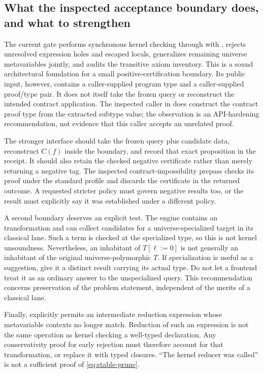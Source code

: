\subsection{What the inspected acceptance boundary does, and what to strengthen}

The current gate performs synchronous kernel checking through  with , rejects unresolved expression holes and escaped locals, generalizes remaining universe metavariables jointly, and audits the transitive axiom inventory. This is a sound architectural foundation for a small positive-certification boundary. Its public input, however, contains a caller-supplied program type and a caller-supplied proof/type pair. It does not itself take the frozen query or reconstruct the intended contract application. The inspected caller in  does construct the contract proof type from the extracted subtype value; the observation is an API-hardening recommendation, not evidence that this caller accepts an unrelated proof.\cite{implementation}

The stronger interface should take the frozen query plus candidate data, reconstruct $C(f)$ inside the boundary, and record that exact proposition in the receipt. It should also retain the checked negative certificate rather than merely returning a negative tag. The inspected contract-impossibility prepass checks its proof under the standard profile and discards the certificate in the returned outcome. A requested stricter policy must govern negative results too, or the result must explicitly say it was established under a different policy.\cite{implementation}

A second boundary deserves an explicit test. The engine contains an  transformation and can collect candidates for a universe-specialized target in its classical lane. Such a term is checked at the specialized type, so this is not kernel unsoundness. Nevertheless, an inhabitant of $T[\ell:=0]$ is not generally an inhabitant of the original universe-polymorphic $T$. If specialization is useful as a suggestion, give it a distinct result carrying its actual type. Do not let a frontend treat it as an ordinary answer to the unspecialized query. This recommendation concerns preservation of the problem statement, independent of the merits of a classical lane.\cite{implementation}

Finally,  explicitly permits an intermediate reduction expression whose metavariable contexts no longer match. Reduction of such an expression is not the same operation as kernel checking a well-typed declaration. Any conservativity proof for early rejection must therefore account for that transformation, or replace it with typed closures. ``The kernel reducer was called'' is not a sufficient proof of \cref{eq:stable-prune}.\cite{implementation}

